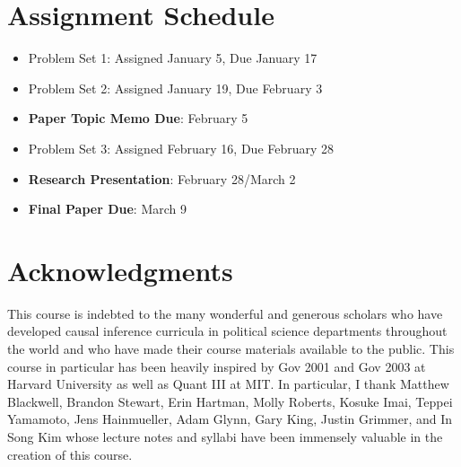 \documentclass[11pt, article, oneside]{memoir}
\theoremstyle{Assumption}
\begin{document}
\section*{Assignment Schedule}

\begin{itemize}
\item Problem Set 1: Assigned January 5, Due January 17
\item Problem Set 2: Assigned January 19, Due February 3
\item \textbf{Paper Topic Memo Due}: February 5
\item Problem Set 3: Assigned February 16, Due February 28
\item \textbf{Research Presentation}: February 28/March 2
\item \textbf{Final Paper Due}: March 9
\end{itemize}

\section*{Acknowledgments}

This course is indebted to the many wonderful and generous scholars who have developed causal inference curricula in political science departments throughout the world and who have made their course materials available to the public. This course in particular has been heavily inspired by Gov 2001 and Gov 2003 at Harvard University as well as Quant III at MIT. In particular, I thank Matthew Blackwell, Brandon Stewart, Erin Hartman, Molly Roberts, Kosuke Imai, Teppei Yamamoto, Jens Hainmueller, Adam Glynn, Gary King, Justin Grimmer, and In Song Kim whose lecture notes and syllabi have been immensely valuable in the creation of this course. 
\end{document}
